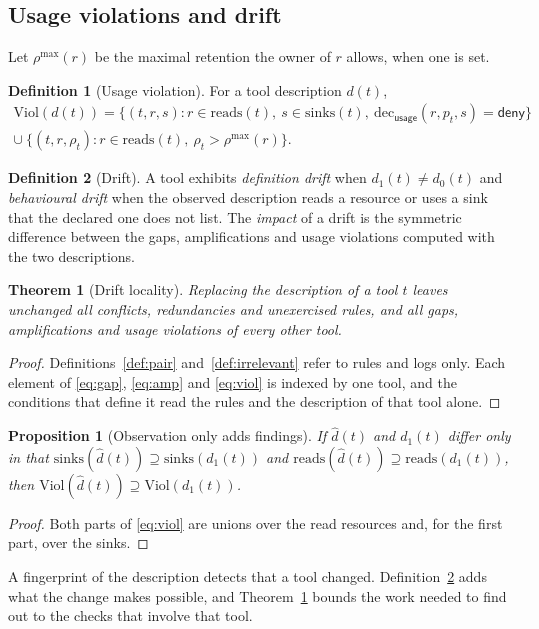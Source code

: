 \documentclass[preprint,12pt]{elsarticle}
\newtheorem{theorem}{Theorem}
\newtheorem{proposition}{Proposition}
\theoremstyle{definition}
\newtheorem{definition}{Definition}
\theoremstyle{remark}
\newcommand{\deny}{\mathsf{deny}}
\newcommand{\dec}{\mathrm{dec}}
\newcommand{\reads}{\mathrm{reads}}
\newcommand{\sinks}{\mathrm{sinks}}
\newcommand{\Viol}{\mathrm{Viol}}
\begin{document}
\subsection{Usage violations and drift}
Let $\rho^{\max}(r)$ be the maximal retention the owner of $r$ allows, when one is set.
\begin{definition}[Usage violation]\label{def:usage}
For a tool description $d(t)$,
\begin{multline}
\Viol(d(t)) = \{(t, r, s) : r \in \reads(t),\ s \in \sinks(t),\ \dec_{\mathsf{usage}}(r, p_t, s) = \deny\}\\
\cup\ \{(t, r, \rho_t) : r \in \reads(t),\ \rho_t > \rho^{\max}(r)\}. \label{eq:viol}
\end{multline}
\end{definition}
\begin{definition}[Drift]\label{def:drift}
A tool exhibits \emph{definition drift} when $d_1(t) \neq d_0(t)$ and \emph{behavioural drift} when the observed description reads a resource or uses a sink that the declared one does not list. The \emph{impact} of a drift is the symmetric difference between the gaps, amplifications and usage violations computed with the two descriptions.
\end{definition}

\begin{theorem}[Drift locality]\label{thm:local}
Replacing the description of a tool $t$ leaves unchanged all conflicts, redundancies and unexercised rules, and all gaps, amplifications and usage violations of every other tool.
\end{theorem}
\begin{proof}
Definitions~\ref{def:pair} and~\ref{def:irrelevant} refer to rules and logs only. Each element of \eqref{eq:gap}, \eqref{eq:amp} and \eqref{eq:viol} is indexed by one tool, and the conditions that define it read the rules and the description of that tool alone.
\end{proof}

\begin{proposition}[Observation only adds findings]\label{prop:observe}
If $\hat d(t)$ and $d_1(t)$ differ only in that $\sinks(\hat d(t)) \supseteq \sinks(d_1(t))$ and $\reads(\hat d(t)) \supseteq \reads(d_1(t))$, then $\Viol(\hat d(t)) \supseteq \Viol(d_1(t))$.
\end{proposition}
\begin{proof}
Both parts of \eqref{eq:viol} are unions over the read resources and, for the first part, over the sinks.
\end{proof}
A fingerprint of the description detects that a tool changed. Definition~\ref{def:drift} adds what the change makes possible, and Theorem~\ref{thm:local} bounds the work needed to find out to the checks that involve that tool.
\end{document}
